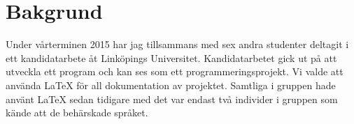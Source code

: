 \section{Bakgrund}
Under vårterminen 2015 har jag tillsammans med sex andra studenter deltagit i ett kandidatarbete åt Linköpings Universitet. Kandidatarbetet gick ut på att utveckla ett program och kan ses som ett programmeringsprojekt. Vi valde att använda {\LaTeX} för all dokumentation av projektet. Samtliga i gruppen hade använt {\LaTeX} sedan tidigare med det var endast två individer i gruppen som kände att de behärskade språket.   
